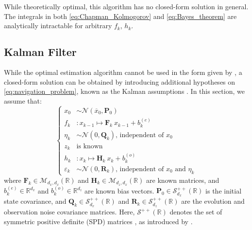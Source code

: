 \begin{algorithm}[!htb]
	\begin{algorithmic}
	\end{algorithmic}\caption{Optimal Bayesian Filter}\label{alg:optimal_estimation}
\end{algorithm}

While theoretically optimal, this algorithm has no closed-form solution in general. The integrals in both \eqref{eq:Chapman_Kolmogorov} and \eqref{eq:Bayes_theorem} are analytically intractable for arbitrary $f_k$, $h_k$.

\subsection{Kalman Filter}

While the optimal estimation algorithm cannot be used in the form given by , a closed-form solution can be obtained by introducing additional hypotheses on \eqref{eq:navigation_problem}, known as the Kalman assumptions \cite{bib:Kalman}. In this section, we assume that:
\begin{equation}
	\left\{\begin{array}{ll}
	x_0&\sim\mathcal{N}(\overline{x}_0,\mathbf{P}_0)\\
	f_k&:x_{k-1}\mapsto \mathbf{F}_k\:x_{k-1}+b_k^{(e)}\\
	\eta_k&\sim\mathcal{N}(0,\mathbf{Q}_k)\text{, independent of }x_0\\
	z_k&\text{is known}\\
	h_k&:x_k\mapsto \mathbf{H}_k\:x_k+b_k^{(o)}\\
	\varepsilon_k&\sim\mathcal{N}(0,\mathbf{R}_k)\text{, independent of }x_0\text{ and }\eta_k
	\end{array}\right.\label{eq:Kalman_assumptions}
\end{equation}
where $\mathbf{F}_k\in\mathcal{M}_{d_x,d_x}(\mathbb{R})$ and $\mathbf{H}_k\in\mathcal{M}_{d_z,d_x}(\mathbb{R})$ are known matrices, and $b_k^{(e)}\in\mathbb{R}^{d_x}$ and $b_k^{(o)}\in\mathbb{R}^{d_z}$ are known bias vectors. $\mathbf{P}_0\in\mathcal{S}_{d_x}^{++}(\mathbb{R})$ is the initial state covariance, and $\mathbf{Q}_k\in\mathcal{S}_{d_x}^{++}(\mathbb{R})$ and $\mathbf{R}_k\in\mathcal{S}_{d_z}^{++}(\mathbb{R})$ are the evolution and observation noise covariance matrices. Here, $\mathcal{S}^{++}(\mathbb{R})$ denotes the set of symmetric positive definite (SPD) matrices \cite{bib:matrix-analysis}, as introduced by .

